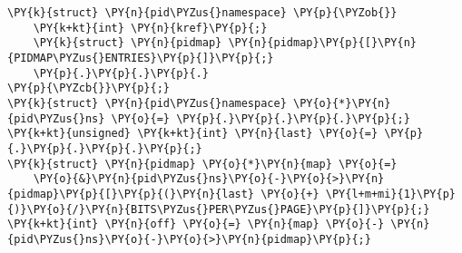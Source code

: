 \begin{Verbatim}[commandchars=\\\{\}]
\PY{k}{struct} \PY{n}{pid\PYZus{}namespace} \PY{p}{\PYZob{}}
    \PY{k+kt}{int} \PY{n}{kref}\PY{p}{;}
    \PY{k}{struct} \PY{n}{pidmap} \PY{n}{pidmap}\PY{p}{[}\PY{n}{PIDMAP\PYZus{}ENTRIES}\PY{p}{]}\PY{p}{;}
    \PY{p}{.}\PY{p}{.}\PY{p}{.}
\PY{p}{\PYZcb{}}\PY{p}{;}
\PY{k}{struct} \PY{n}{pid\PYZus{}namespace} \PY{o}{*}\PY{n}{pid\PYZus{}ns} \PY{o}{=} \PY{p}{.}\PY{p}{.}\PY{p}{.}\PY{p}{;}
\PY{k+kt}{unsigned} \PY{k+kt}{int} \PY{n}{last} \PY{o}{=} \PY{p}{.}\PY{p}{.}\PY{p}{.}\PY{p}{;}
\PY{k}{struct} \PY{n}{pidmap} \PY{o}{*}\PY{n}{map} \PY{o}{=}
    \PY{o}{&}\PY{n}{pid\PYZus{}ns}\PY{o}{-}\PY{o}{>}\PY{n}{pidmap}\PY{p}{[}\PY{p}{(}\PY{n}{last} \PY{o}{+} \PY{l+m+mi}{1}\PY{p}{)}\PY{o}{/}\PY{n}{BITS\PYZus{}PER\PYZus{}PAGE}\PY{p}{]}\PY{p}{;}
\PY{k+kt}{int} \PY{n}{off} \PY{o}{=} \PY{n}{map} \PY{o}{-} \PY{n}{pid\PYZus{}ns}\PY{o}{-}\PY{o}{>}\PY{n}{pidmap}\PY{p}{;}
\end{Verbatim}
